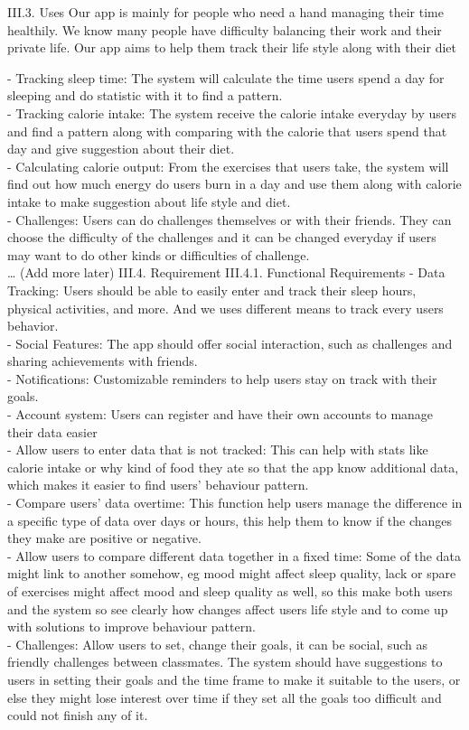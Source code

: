 \documentclass[12pt]{article}
\begin{document}
III.3. Uses
Our app is mainly for people who need a hand managing their time healthily. We know many people have difficulty balancing their work and their private life. Our app aims to help them track their life style along with their diet\par
-    Tracking sleep time: The system will calculate the time users spend a day for sleeping and do statistic with it to find a pattern.\\
-    Tracking calorie intake: The system receive the calorie intake everyday by users and find a pattern along with comparing with the calorie that users spend that day and give suggestion about their diet.\\
-    Calculating calorie output: From the exercises that users take, the system will find out how much energy do users burn in a day and use them along with calorie intake to make suggestion about life style and diet.\\
-    Challenges: Users can do challenges themselves or with their friends. They can choose the difficulty of the challenges and it can be changed everyday if users may want to do other kinds or difficulties of challenge.\\
…
(Add more later)
III.4. Requirement
III.4.1. Functional Requirements
-    Data Tracking: Users should be able to easily enter and track their sleep hours, physical activities, and more. And we uses different means to track every users behavior.\\
-    Social Features: The app should offer social interaction, such as challenges and sharing achievements with friends.\\
-    Notifications: Customizable reminders to help users stay on track with their goals.\\
-    Account system: Users can register and have their own accounts to manage their data easier\\
-    Allow users to enter data that is not tracked: This can help with stats like calorie intake or why kind of food they ate so that the app know additional data, which makes it easier to find users’ behaviour pattern.\\
-    Compare users’ data overtime: This function help users manage the difference in a specific type of data over days or hours, this help them to know if the changes they make are positive or negative.\\
-    Allow users to compare different data together in a fixed time: Some of the data might link to another somehow, eg mood might affect sleep quality, lack or spare of exercises might affect mood and sleep quality as well, so this make both users and the system so see clearly how changes affect users life style and to come up with solutions to improve behaviour pattern.\\
-    Challenges: Allow users to set, change their goals, it can be social, such as friendly challenges between classmates. The system should have suggestions to users in setting their goals and the time frame to make it suitable to the users, or else they might lose interest over time if they set all the goals too difficult and could not finish any of it.\\
 
\end{document}
